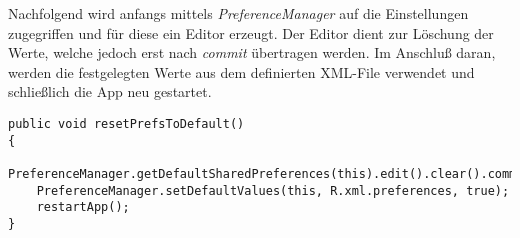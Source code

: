 Nachfolgend wird anfangs mittels \emph{PreferenceManager} auf die Einstellungen zugegriffen und für diese ein Editor erzeugt. Der Editor dient zur Löschung der Werte, welche jedoch erst nach \emph{commit} übertragen werden. Im Anschluß daran, werden die festgelegten Werte aus dem definierten XML-File verwendet und schließlich die App neu gestartet.
\begin{lstlisting}[caption={Die Methode für das Zurücksetzen der Einstellungen},label=lst:resetSettingsMethod]
public void resetPrefsToDefault()
{
	PreferenceManager.getDefaultSharedPreferences(this).edit().clear().commit();	
	PreferenceManager.setDefaultValues(this, R.xml.preferences, true);
	restartApp();
}
\end{lstlisting}

